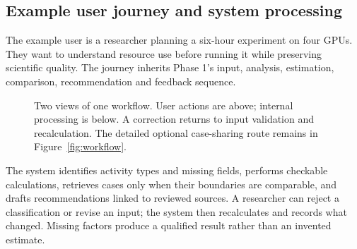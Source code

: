 \subsection{Example user journey and system processing}
The example user is a researcher planning a six-hour experiment on four GPUs. They want to understand resource use before running it while preserving scientific quality. The journey inherits Phase 1's input, analysis, estimation, comparison, recommendation and feedback sequence.
\begin{figure}[H]
\centering
{}
\caption{Two views of one workflow. User actions are above; internal processing is below. A correction returns to input validation and recalculation. The detailed optional case-sharing route remains in Figure~\ref{fig:workflow}.}
\label{fig:phase2-two-lanes}
\end{figure}
The system identifies activity types and missing fields, performs checkable calculations, retrieves cases only when their boundaries are comparable, and drafts recommendations linked to reviewed sources. A researcher can reject a classification or revise an input; the system then recalculates and records what changed. Missing factors produce a qualified result rather than an invented estimate.


